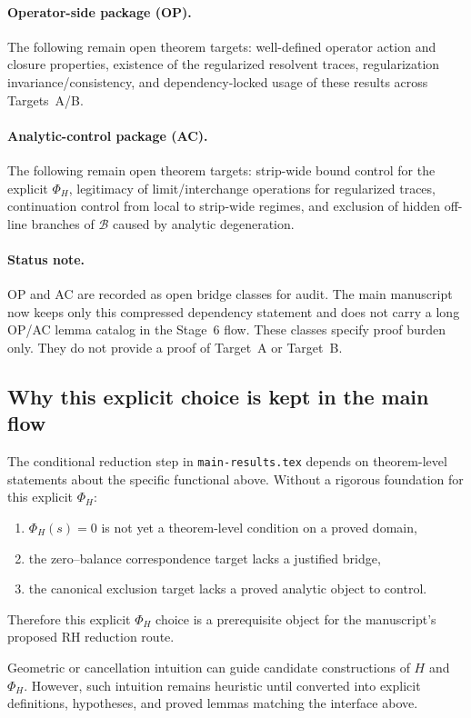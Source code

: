 \paragraph{Operator-side package (OP).}
The following remain open theorem targets: well-defined operator action and closure properties, existence of the regularized resolvent traces, regularization invariance/consistency, and dependency-locked usage of these results across Targets~A/B.

\paragraph{Analytic-control package (AC).}
The following remain open theorem targets: strip-wide bound control for the explicit $\Phi_H$, legitimacy of limit/interchange operations for regularized traces, continuation control from local to strip-wide regimes, and exclusion of hidden off-line branches of $\mathcal{B}$ caused by analytic degeneration.

\paragraph{Status note.}
OP and AC are recorded as open bridge classes for audit.
The main manuscript now keeps only this compressed dependency statement and does not carry a long OP/AC lemma catalog in the Stage~6 flow.
These classes specify proof burden only.
They do not provide a proof of Target~A or Target~B.

\subsection*{Why this explicit choice is kept in the main flow}
The conditional reduction step in \texttt{main-results.tex} depends on theorem-level statements about the specific functional above.
Without a rigorous foundation for this explicit $\Phi_H$:
\begin{enumerate}
  \item $\Phi_H(s)=0$ is not yet a theorem-level condition on a proved domain,
  \item the zero--balance correspondence target lacks a justified bridge,
  \item the canonical exclusion target lacks a proved analytic object to control.
\end{enumerate}
Therefore this explicit $\Phi_H$ choice is a prerequisite object for the manuscript's proposed RH reduction route.

\begin{heuristic}
Geometric or cancellation intuition can guide candidate constructions of $H$ and $\Phi_H$.
However, such intuition remains heuristic until converted into explicit definitions, hypotheses, and proved lemmas matching the interface above.
\end{heuristic}
